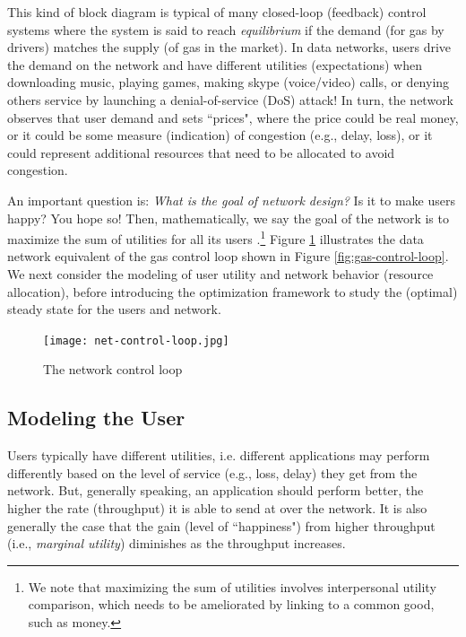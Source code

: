 \documentclass{article}
\begin{document}
This kind of block diagram is typical of many closed-loop (feedback) control systems where the system is said to reach {\em equilibrium} if the demand (for gas by drivers) matches the supply (of gas in the market). In data networks, users drive the demand on the network and have different utilities (expectations) when downloading music, playing games, making skype (voice/video) calls, or denying others service by launching a denial-of-service (DoS) attack! In turn, the network observes that user demand and sets ``prices", where the price could be real money, or it could be some measure (indication) of congestion (e.g., delay, loss), or it could represent additional resources that need to be allocated to avoid congestion. 

An important question is: {\em What is the goal of network design?} Is it to make users happy? You hope so! Then, mathematically, we say the goal of the network is to maximize the sum of utilities for all its users \cite{elastic:2006}.\footnote{We note that maximizing the sum of utilities involves interpersonal utility comparison, which needs to be ameliorated by linking to a common good, such as money.} Figure \ref{fig:net-control-loop} illustrates the data network equivalent of the gas control loop shown in Figure \ref{fig:gas-control-loop}. We next consider the modeling of user utility and network behavior (resource allocation), before introducing the optimization framework to study the (optimal) steady state for the users and network.


\begin{figure}[htbp] %
   \centering
   \texttt{[image: net-control-loop.jpg]} 
   \caption{The network control loop}
   \label{fig:net-control-loop}
\end{figure}


\subsection{Modeling the User}

Users typically have different utilities, i.e. different applications may perform differently based on the level of service (e.g., loss, delay) they get from the network. But, generally speaking, an application should perform better, the higher the rate (throughput) it is able to send at over the network. It is also generally the case that the gain (level of ``happiness") from higher throughput (i.e., {\em marginal utility}) diminishes as the throughput increases.  
\end{document}
